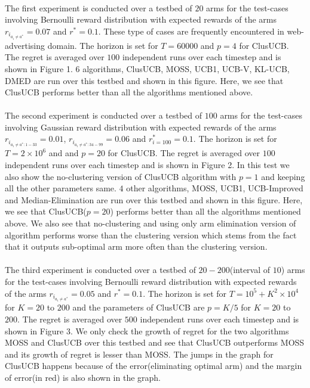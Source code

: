 \paragraph{}The first experiment is conducted over a testbed of $20$ arms for the test-cases involving Bernoulli reward distribution with expected rewards of the arms $r_{i_{a_{i}\neq a^{*}}}=0.07$ and $r^{*}=0.1$. These type of cases are frequently encountered in web-advertising domain. The horizon is set for $T=60000$ and $p=4$ for ClusUCB. The regret is averaged over $100$ independent runs over each timestep and is shown in Figure 1. $6$ algorithms, ClusUCB, MOSS, UCB1, UCB-V, KL-UCB, DMED are run over this testbed and shown in this figure. Here, we see that ClusUCB performs better than all the algorithms mentioned above.

\paragraph{}The second experiment is conducted over a testbed of $100$ arms for the test-cases involving Gaussian reward distribution with expected rewards of the arms $r_{i_{a_{i}\neq a^{*}:1-33}}=0.01$, $r_{i_{a_{i}\neq a^{*}:34-99}}=0.06$ and $r^{*}_{i=100}=0.1$. The horizon is set for $T=2\times 10^{6}$ and and $p=20$ for ClusUCB. The regret is averaged over $100$ independent runs over each timestep and is shown in Figure 2. In this test we also show the no-clustering version of ClusUCB algorithm with $p=1$ and keeping all the other parameters same. $4$ other algorithms, MOSS, UCB1, UCB-Improved and Median-Elimination are run over this testbed and shown in this figure. Here, we see that ClusUCB($p=20$) performs better than all the algorithms mentioned above. We also see that no-clustering and using only arm elimination version of algorithm performs worse than the clustering version which stems from the fact that it outputs sub-optimal arm more often than the clustering version.

\paragraph{}The third experiment is conducted over a testbed of $20-200$(interval of $10$) arms for the test-cases involving Bernoulli reward distribution with expected rewards of the arms $r_{i_{a_{i}\neq a^{*}}}=0.05$ and $r^{*}=0.1$. The horizon is set for $T=10^{5} + K^{2}\times 10^{4}$ for $K=20$ to $200$ and the parameters of ClusUCB are $p=K/5$ for $K=20$ to $200$. The regret is averaged over $500$ independent runs over each timestep and is shown in Figure 3. We only check the growth of regret for the two algorithms MOSS and ClusUCB over this testbed and see that ClusUCB outperforms MOSS and its growth of regret is lesser than MOSS. The jumps in the graph for ClusUCB happens because of the error(eliminating optimal arm) and the margin of error(in red) is also shown in the graph. 